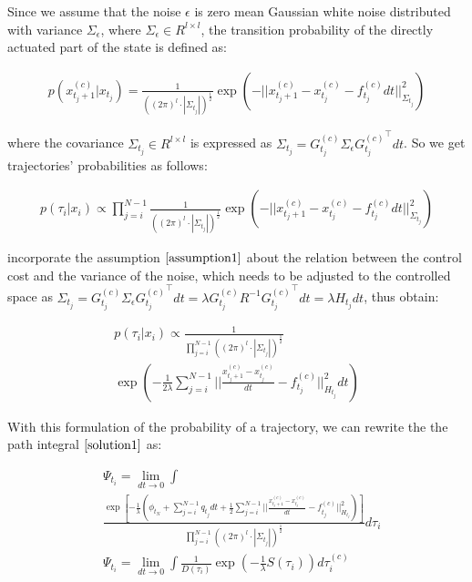 \documentclass[journal]{IEEEtran}
\begin{document}
Since we assume that the noise $\epsilon$ is zero mean Gaussian white noise distributed with variance $\Sigma_{\epsilon}$, where $\Sigma_{\epsilon} \in R^{l\times l}$,
the transition probability of the directly actuated part of the state is defined as:

\begin{equation}
  \begin{aligned}
    p (x_{t_j+1}^{(c)} |x_{t_j} ) =  \frac{1}{((2\pi)^{l} \cdot |\Sigma_{t_j}|)^{\frac{1}{2}}} \exp( -|| x_{t_j+1}^{(c)} - x_{t_j}^{(c)} - f_{t_j}^{(c)}dt||^2_{\Sigma_{t_j}})
  \end{aligned}
  \label{transition directly}
\end{equation}

where the covariance $\Sigma_{t_j} \in R^{l\times l}$ is expressed as $\Sigma_{t_j} = G_{t_j}^{(c)} \Sigma_{\epsilon}{G_{t_j}^{(c)}}^{\top} dt$. So we get trajectories' probabilities
as follows: 

\begin{equation}
  \begin{aligned}
    p(\tau_i|x_i) \propto \prod_{j = i}^{N-1}  \frac{1}{((2\pi)^{l} \cdot |\Sigma_{t_j}|)^{\frac{1}{2}}} \exp( -|| x_{t_j+1}^{(c)} - x_{t_j}^{(c)} - f_{t_j}^{(c)}dt||^2_{\Sigma_{t_j}})
  \end{aligned}
  \label{transition directly}
\end{equation}


incorporate the assumption $\ref{assumption1}$ about the relation between the control cost and the variance of the noise,  which needs to be adjusted to the controlled space as
$\Sigma_{t_j} = G_{t_j}^{(c)}\Sigma_{\epsilon}{G_{t_j}^{(c)}}^{\top}dt  = \lambda G_{t_j}^{(c)} R^{-1}{G_{t_j}^{(c)}}^{\top} dt = \lambda H_{t_j} dt $, thus obtain:

\begin{equation}
  \begin{aligned}
    p(\tau_i|x_i) \propto  \frac{1}{\prod_{j = i}^{N-1} ((2\pi)^{l} \cdot |\Sigma_{t_j}|)^{\frac{1}{2}}} \\ \exp( -\frac{1}{2\lambda}\sum_{j=i}^{N-1}|| \frac{x_{t_j+1}^{(c)} - x_{t_j}^{(c)}}{dt} - f_{t_j}^{(c)}||^2_{H_{t_j}}dt)
  \end{aligned}
  \label{transition directly}
\end{equation}


With this formulation of the probability of a trajectory, we can rewrite the the path integral $\ref{solution1}$ as:

\begin{equation}
  \begin{aligned}
  &\Psi_{t_i}  = \lim_{dt\to 0}\int \\ 
  &\frac{\exp[-\frac{1}{\lambda}(\phi_{t_N}+\sum_{j=i}^{N-1}q_{t_j}dt + \frac{1}{2}\sum_{j=i}^{N-1}|| \frac{x_{t_j+1}^{(c)} - x_{t_j}^{(c)}}{dt} - f_{t_j}^{(c)}||^2_{H_{t_j}})]}{\prod_{j = i}^{N-1} ((2\pi)^{l} \cdot |\Sigma_{t_j}|)^{\frac{1}{2}}}d\tau_i \nonumber \\
  &\Psi_{t_i}   = \lim_{dt\to 0}\int \frac{1}{D(\tau_i)}\exp(-\frac{1}{\lambda}S(\tau_i))d\tau_i^{(c)}
  \label{solution2}
  \end{aligned}
\end{equation}
\end{document}
